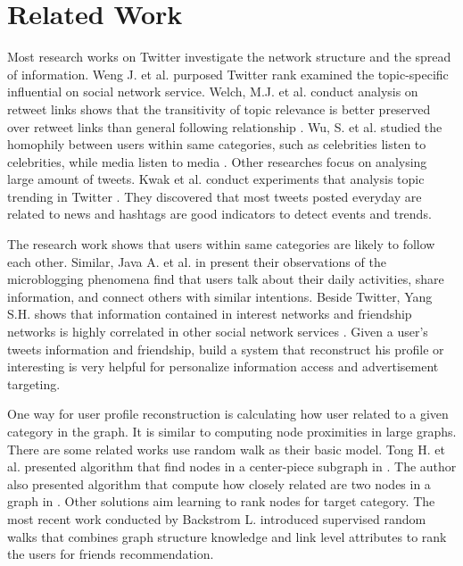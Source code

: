 
\section{Related Work}\label{sec:related-work}

Most research works on Twitter investigate the network structure and the spread of information. Weng J. et al. purposed Twitter rank \cite{twitterrank} examined the topic-specific influential on social network service. Welch, M.J. et al. conduct analysis on retweet links shows that the transitivity of topic relevance is better preserved over retweet links than general following relationship \cite{welch2011topical}. Wu, S. et al. studied the homophily between users within same categories, such as celebrities listen to celebrities, while media listen to media \cite{wu2011says}. Other researches focus on analysing large amount of tweets. Kwak et al. conduct experiments that analysis topic trending in Twitter \cite{kwak2010twitter}. They discovered that most tweets posted everyday are related to news and hashtags are good indicators to detect events and trends. 

The research work \cite{wu2011says} shows that users within same categories are likely to follow each other. Similar, Java A. et al. in \cite{java2007we} present their observations of the microblogging phenomena find that users talk about their daily activities, share information, and connect others with similar intentions. Beside Twitter, Yang S.H. shows that information contained in interest networks and friendship networks is highly correlated in other social network services \cite{yang2011like}. Given a user's tweets information and friendship, build a system that reconstruct his profile or interesting is very helpful for personalize information access and advertisement targeting.

One way for user profile reconstruction is calculating how user related to a given category in the graph. It is similar to computing node proximities in large graphs. There are some related works use random walk as their basic model. Tong H. et al. presented algorithm that find nodes in a center-piece subgraph in \cite{centerpiece}. The author also presented algorithm that compute how closely related are two nodes in a graph in \cite{fastrankdomwalk}. Other solutions aim learning to rank nodes for target category. The most recent work \cite{backstrom2011supervised} conducted by Backstrom L. introduced supervised random walks that combines graph structure knowledge and link level attributes to rank the users for friends recommendation.